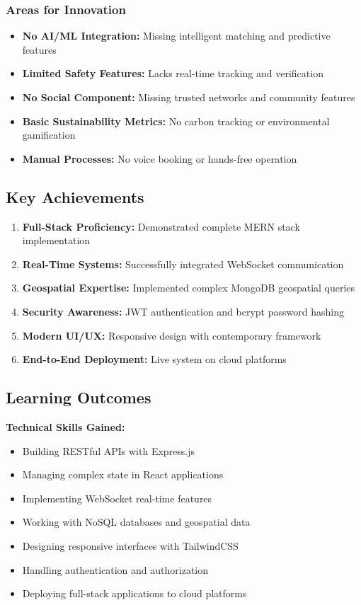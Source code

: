 \documentclass[12pt,a4paper]{article}
\begin{document}
\subsubsection{Areas for Innovation}
\begin{itemize}
    \item \textbf{No AI/ML Integration:} Missing intelligent matching and predictive features
    \item \textbf{Limited Safety Features:} Lacks real-time tracking and verification
    \item \textbf{No Social Component:} Missing trusted networks and community features
    \item \textbf{Basic Sustainability Metrics:} No carbon tracking or environmental gamification
    \item \textbf{Manual Processes:} No voice booking or hands-free operation
\end{itemize}

\subsection{Key Achievements}

\begin{enumerate}
    \item \textbf{Full-Stack Proficiency:} Demonstrated complete MERN stack implementation
    \item \textbf{Real-Time Systems:} Successfully integrated WebSocket communication
    \item \textbf{Geospatial Expertise:} Implemented complex MongoDB geospatial queries
    \item \textbf{Security Awareness:} JWT authentication and bcrypt password hashing
    \item \textbf{Modern UI/UX:} Responsive design with contemporary framework
    \item \textbf{End-to-End Deployment:} Live system on cloud platforms
\end{enumerate}

\subsection{Learning Outcomes}

\textbf{Technical Skills Gained:}
\begin{itemize}
    \item Building RESTful APIs with Express.js
    \item Managing complex state in React applications
    \item Implementing WebSocket real-time features
    \item Working with NoSQL databases and geospatial data
    \item Designing responsive interfaces with TailwindCSS
    \item Handling authentication and authorization
    \item Deploying full-stack applications to cloud platforms
\end{itemize}
\end{document}
